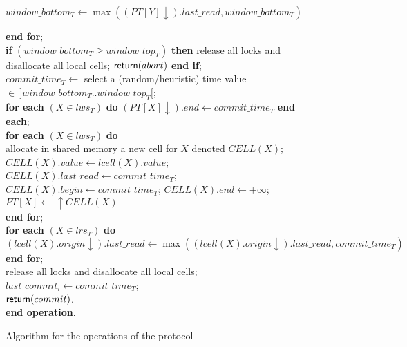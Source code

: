 \begin{figure}[htb!]
{{\begin{minipage}[t]{150mm}
\begin{tabbing}
               $window\_bottom_T \leftarrow 
               \max((PT[Y]\downarrow).last\_read, window\_bottom_T)$ 

               {\bf end for}; \\
	
 \> {\bf if} $(window\_bottom_T \geq window\_top_T)$ {\bf then}
      release all locks and disallocate all local cells; 		
      ${\sf return}(abort)$ {\bf end if};\\


 \> $commit\_time_T \leftarrow$ 
         select a (random/heuristic) time value
         $\in ~]window\_bottom_T.. window\_top_T[$; \\

 \> {\bf for each} $(X \in lws_T)$ {\bf do} 
       $(PT[X] \downarrow).\mathit{end} 
            \leftarrow \mathit{commit\_time}_T$  {\bf end each};\\


 \> {\bf for each} $(X \in lws_T)$ {\bf do} \\


 \>\> 
       allocate in shared memory  a new cell for $X$ denoted $CELL(X)$; \\

 \>\>  $CELL(X).value \gets lcell(X).value$;
                  $CELL(X).last\_read \gets commit\_time_T$;\\

 \>\>  $CELL(X).begin \gets commit\_time_T$; 
                  $CELL(X).end \leftarrow +\infty$;\\

 \>\>  $PT[X]  \leftarrow  ~ \uparrow CELL(X)$ \\

 \> {\bf end for};\\

 \> {\bf for each} $(X \in lrs_T)$ {\bf do} \\


 \>\>
   $(lcell(X).origin \downarrow).last\_read \leftarrow 
     \max((lcell(X).origin \downarrow).last\_read, commit\_time_T)$ \\

 \> {\bf end for};\\

 \> release all locks and disallocate all  local cells; 
               $last\_commit_i \leftarrow commit\_time_T$;\\
	
 \> ${\sf return}(commit)$. \\

{\bf end operation}. 

\end{tabbing}
\normalsize
\end{minipage}
}
\caption{Algorithm for the operations of the protocol}
\label{fig:ttc-protocol}
}
\end{figure}
